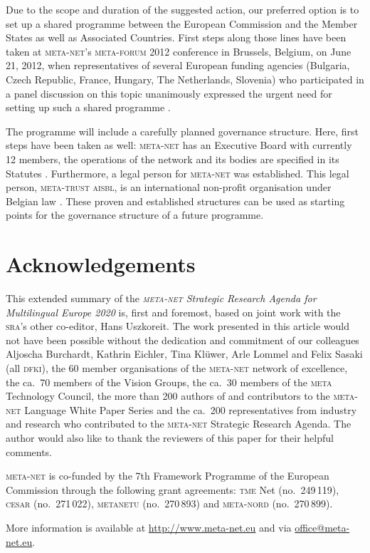 \documentclass[output=paper]{LSP/langsci}
\begin{document}
Due to the scope and duration of the suggested action, our preferred
option is to set up a shared programme between the European Commission
and the Member States as well as Associated Countries. First steps
along those lines have been taken at \textsc{meta-net}'s \textsc{meta-forum} 2012
conference in Brussels, Belgium, on June 21, 2012, when
representatives of several European funding agencies (Bulgaria, Czech
Republic, France, Hungary, The Netherlands, Slovenia) who participated
in a panel discussion on this topic unanimously expressed the urgent
need for setting up such a shared programme \citep{mf2012}.

The programme will include a carefully planned governance
structure. Here, first steps have been taken as well: \textsc{meta-net} has an
Executive Board with currently 12 members, the operations of the
network and its bodies are specified in its Statutes
\citep{statutes2012}. Furthermore, a legal person for \textsc{meta-net} was
established. This legal person, \textsc{meta-trust} \textsc{aisbl}, is an international
non-profit organisation under Belgian law \citep{metatrust2012}. These
proven and established structures can be used as starting points for
the governance structure of a future programme.

\section*{Acknowledgements}
\label{sec:acknowledgements}

This extended summary of the \emph{\textsc{meta-net} Strategic Research Agenda
  for Multilingual Europe 2020} \citep{SRA2013} is, first and
foremost, based on joint work with the \textsc{sra}'s other co-editor, Hans
Uszkoreit. The work presented in this article would not have been
possible without the dedication and commitment of our colleagues
Aljoscha Burchardt, Kathrin Eichler, Tina Klüwer, Arle Lommel and
Felix Sasaki (all \textsc{dfki}), the 60 member organisations of the \textsc{meta-net}
network of excellence, the ca.~70 members of the Vision Groups, the
ca.~30 members of the \textsc{meta} Technology Council, the more than 200
authors of and contributors to the \textsc{meta-net} Language White Paper
Series \citep{LWP2012} and the ca.~200 representatives from industry
and research who contributed to the \textsc{meta-net} Strategic Research
Agenda. The author would also like to thank the reviewers of this
paper for their helpful comments.

\textsc{meta-net} is co-funded by the 7th Framework Programme of the European
Commission through the following grant agreements: \textsc{tme} Net
(no.~249\,119), \textsc{cesar} (no.~271\,022), \textsc{metanetu} (no.~270\,893) and
\textsc{meta-nord} (no.~270\,899).

More information is available at \url{http://www.meta-net.eu} and via
\url{office@meta-net.eu}.

 


\sloppy
\printbibliography[heading=subbibliography,notkeyword=this]
\end{document}
